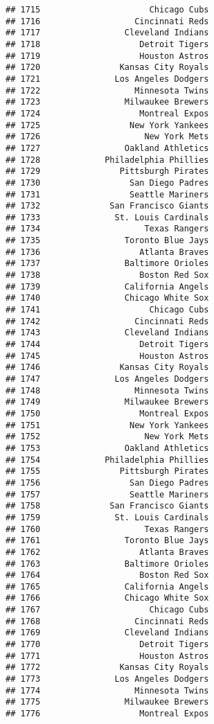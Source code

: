 \documentclass[]{article}
\begin{document}
\begin{verbatim}
## 1715                      Chicago Cubs
## 1716                   Cincinnati Reds
## 1717                 Cleveland Indians
## 1718                    Detroit Tigers
## 1719                    Houston Astros
## 1720                Kansas City Royals
## 1721               Los Angeles Dodgers
## 1722                   Minnesota Twins
## 1723                 Milwaukee Brewers
## 1724                    Montreal Expos
## 1725                  New York Yankees
## 1726                     New York Mets
## 1727                 Oakland Athletics
## 1728             Philadelphia Phillies
## 1729                Pittsburgh Pirates
## 1730                  San Diego Padres
## 1731                  Seattle Mariners
## 1732              San Francisco Giants
## 1733               St. Louis Cardinals
## 1734                     Texas Rangers
## 1735                 Toronto Blue Jays
## 1736                    Atlanta Braves
## 1737                 Baltimore Orioles
## 1738                    Boston Red Sox
## 1739                 California Angels
## 1740                 Chicago White Sox
## 1741                      Chicago Cubs
## 1742                   Cincinnati Reds
## 1743                 Cleveland Indians
## 1744                    Detroit Tigers
## 1745                    Houston Astros
## 1746                Kansas City Royals
## 1747               Los Angeles Dodgers
## 1748                   Minnesota Twins
## 1749                 Milwaukee Brewers
## 1750                    Montreal Expos
## 1751                  New York Yankees
## 1752                     New York Mets
## 1753                 Oakland Athletics
## 1754             Philadelphia Phillies
## 1755                Pittsburgh Pirates
## 1756                  San Diego Padres
## 1757                  Seattle Mariners
## 1758              San Francisco Giants
## 1759               St. Louis Cardinals
## 1760                     Texas Rangers
## 1761                 Toronto Blue Jays
## 1762                    Atlanta Braves
## 1763                 Baltimore Orioles
## 1764                    Boston Red Sox
## 1765                 California Angels
## 1766                 Chicago White Sox
## 1767                      Chicago Cubs
## 1768                   Cincinnati Reds
## 1769                 Cleveland Indians
## 1770                    Detroit Tigers
## 1771                    Houston Astros
## 1772                Kansas City Royals
## 1773               Los Angeles Dodgers
## 1774                   Minnesota Twins
## 1775                 Milwaukee Brewers
## 1776                    Montreal Expos

\end{verbatim}
\end{document}
